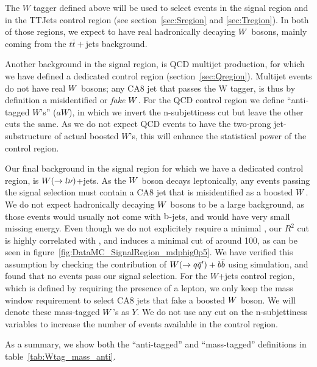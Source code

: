 The $W$ tagger defined above will be used to select events in the signal region and in the TTJets
control region (see section~\ref{sec:Sregion} and \ref{sec:Tregion}). In both of those regions, we
expect to have real hadronically decaying $W$ bosons, mainly coming from the $t\bar{t}+$jets
background. 

Another background in the signal region, is QCD multijet production, for which we have defined a
dedicated control region (section~\ref{sec:Qregion}). Multijet events do not have real $W$ bosons;
any CA8 jet that passes the W tagger, is thus by definition a misidentified or \textit{fake} $W$. 
For the QCD control region we define ``anti-tagged $W$'s'' ($aW$), in which we invert the
n-subjettiness cut but leave the other cuts the same. 
As we do not expect QCD events to have the two-prong jet-substructure of actual boosted $W$'s, this
will enhance the statistical power of the control region. 

Our final background in the signal region for which we have a dedicated control region, is
$W(\rightarrow l\nu)$+jets. 
As the $W$ boson decays leptonically, any events passing the signal selection must contain a CA8
jet that is misidentified as a boosted $W$. 
We do not expect hadronically decaying $W$ bosons to be a large background, as those events would
usually not come with $\mathrm{b}$-jets, and would have very small missing energy. Even though we do not
explicitely require a minimal \ETm, our $R^2$ cut is highly correlated with \ETm, and induces
a minimal cut of around 100\GeV, as can be seen in figure~\ref{fig:DataMC_SignalRegion_mdphig0p5}.  
We have verified this assumption by checking the contribution of $W(\rightarrow
q\bar{q}')+b\bar{b}$ using simulation, and found that no events pass our signal selection. 
For the $W$+jets control region, which is defined by requiring the presence of a lepton, we only
keep the mass window requirement to select CA8 jets that fake a boosted $W$ boson. We will denote
these mass-tagged $W$'s as $Y$. We do not use any cut on the n-subjettiness variables to increase
the number of events available in the control region. 

As a summary, we show both the ``anti-tagged'' and ``mass-tagged'' definitions in
table~\ref{tab:Wtag_mass_anti}.

